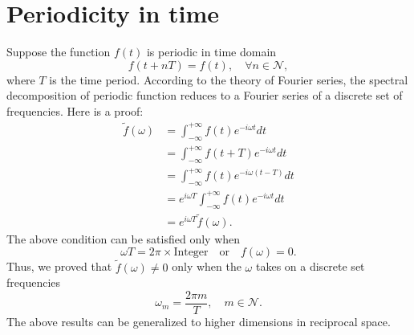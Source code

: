 \documentclass[
10pt, %
a4paper, %
oneside, %
headinclude,footinclude, %
BCOR5mm, %
]{scrartcl}
\begin{document}
\section{Periodicity in time}
Suppose the function $f(t)$ is periodic in time domain
\begin{equation}
f(t+nT) = f(t), \quad \forall n\in \mathcal{N},
\end{equation}
where $T$ is the time period. According to the theory of Fourier series, the spectral decomposition of periodic function reduces to a Fourier series of a discrete set of frequencies. Here is a proof:
\begin{align}
\nonumber \tilde{f}(\omega) &= \int_{-\infty}^{+\infty} f(t) e^{-i\omega t}dt\\
\nonumber &= \int_{-\infty}^{+\infty} f(t+T) e^{-i\omega t}dt\\
\nonumber &= \int_{-\infty}^{+\infty} f(t) e^{-i\omega (t-T)}dt\\
\nonumber &= e^{i\omega T}\int_{-\infty}^{+\infty} f(t) e^{-i\omega t}dt\\
\nonumber &= e^{i\omega T}\tilde{f}(\omega).
\end{align}
The above condition can be satisfied only when
\begin{equation}
\omega T = 2\pi\times\text{Integer}\quad \text{or} \quad f(\omega)=0.
\end{equation}
Thus, we proved that $\tilde{f}(\omega)\neq 0$ only when the $\omega$ takes on a discrete set frequencies
\begin{equation}
\omega_m = \frac{2\pi m}{T}, \quad m \in \mathcal{N}.
\end{equation}
The above results can be generalized to higher dimensions in reciprocal space.\\
\end{document}
